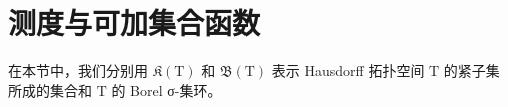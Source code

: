 \section{测度与可加集合函数}

在本节中，我们分别用 \(\mathfrak{K}(\mathrm{T})\) 和 \(\mathfrak{B}(\mathrm{T})\) 表示 Hausdorff 拓扑空间 \(\mathrm{T}\) 的紧子集所成的集合和 \(\mathrm{T}\) 的 Borel σ-集环。

